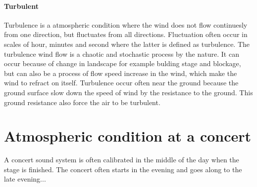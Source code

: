 \paragraph{Turbulent} Turbulence is a atmospheric condition where the wind does not flow continuesly from one direction, but fluctuates from all directions. Fluctuation often occur in scales of hour, minutes and second where the latter is defined as turbulence. The turbulence wind flow is a chaotic and stochastic process by the nature. It can occur because of change in landscape for example bulding stage and blockage, but can also be a process of flow speed increase in the wind, which make the wind to refract on itself. Turbulence occur often near the ground because the ground surface slow down the speed of wind by the resistance to the ground. This ground resistance also force the air to be turbulent.


 \section{Atmospheric condition at a concert}
A concert sound system is often calibrated in the middle of the day when the stage is finished. The concert often starts in the evening and goes along to the late evening...
















